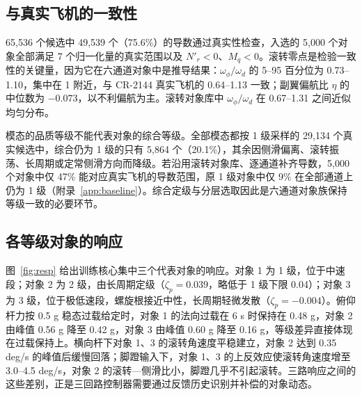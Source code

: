 \documentclass[UTF8,a4paper,11pt,fontset=fandol,scheme=plain]{ctexart}
\begin{document}
\subsection{与真实飞机的一致性}
65,536 个候选中 49,539 个（75.6\%）的导数通过真实性检查，入选的 5,000 个对象全部满足 7 个归一化量的真实范围以及 \(N'_r<0\)、\(M_q<0\)。滚转零点是检验一致性的关键量，因为它在六通道对象中是推导结果：\(\omega_\phi/\omega_d\) 的 5–95 百分位为 0.73–1.10，集中在 1 附近，与 CR-2144 真实飞机的 0.64–1.13 一致；副翼偏航比 \(\eta\) 的中位数为 \(-0.073\)，以不利偏航为主。滚转对象库中 \(\omega_\phi/\omega_d\) 在 0.67–1.31 之间近似均匀分布。

模态的品质等级不能代表对象的综合等级。全部模态都按 1 级采样的 29,134 个真实候选中，综合仍为 1 级的只有 5,864 个（20.1\%），其余因侧滑偏离、滚转振荡、长周期或定常侧滑方向而降级。若沿用滚转对象库、逐通道补齐导数，5,000 个对象中仅 47\% 能对应真实飞机的导数范围，原 1 级对象中仅 9\% 在全部通道上仍为 1 级（附录~\ref{app:baseline}）。综合定级与分层选取因此是六通道对象族保持等级一致的必要环节。

\subsection{各等级对象的响应}
图~\ref{fig:resp} 给出训练核心集中三个代表对象的响应。对象 1 为 1 级，位于中速段；对象 2 为 2 级，由长周期定级（\(\zeta_p=0.039\)，略低于 1 级下限 0.04）；对象 3 为 3 级，位于极低速段，螺旋根接近中性，长周期轻微发散（\(\zeta_p=-0.004\)）。俯仰杆力按 0.5 g 稳态过载给定时，对象 1 的法向过载在 6 s 时保持在 0.48 g，对象 2 由峰值 0.56 g 降至 0.42 g，对象 3 由峰值 0.60 g 降至 0.16 g，等级差异直接体现在过载保持上。横向杆下对象 1、3 的滚转角速度平稳建立，对象 2 达到 0.35 deg/s 的峰值后缓慢回落；脚蹬输入下，对象 1、3 的上反效应使滚转角速度增至 3.0–4.5 deg/s，对象 2 的滚转—侧滑比小，脚蹬几乎不引起滚转。三路响应之间的这些差别，正是三回路控制器需要通过反馈历史识别并补偿的对象动态。
\end{document}
